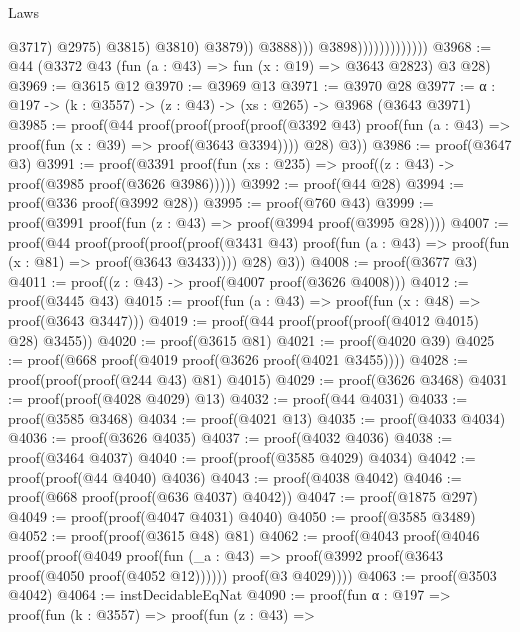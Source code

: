 \begin{lexlean}{Laws}
\begin{coremodule}
                                                                @3717)
                                                              @2975)
                                                            @3815)
                                                          @3810)
                                                        @3879))
                                                  @3888)))
                                        @3898)))))))))))))
@3968 := @44 (@3372 @43 (fun (a : @43) => fun (x : @19) => @3643 @2823) @3 @28)
@3969 := @3615 @12
@3970 := @3969 @13
@3971 := @3970 @28
@3977 := {α : @197} -> (k : @3557) -> (z : @43) -> (xs : @265) -> @3968 (@3643 @3971)
@3985 := proof(@44
      proof(proof(proof(proof(@3392 @43)
              proof(fun (a : @43) => proof(fun (x : @39) => proof(@3643 @3394))))
            @28)
          @3))
@3986 := proof(@3647 @3)
@3991 := proof(@3391 proof(fun (xs : @235) => proof((z : @43) -> proof(@3985 proof(@3626 @3986)))))
@3992 := proof(@44 @28)
@3994 := proof(@336 proof(@3992 @28))
@3995 := proof(@760 @43)
@3999 := proof(@3991 proof(fun (z : @43) => proof(@3994 proof(@3995 @28))))
@4007 := proof(@44
      proof(proof(proof(proof(@3431 @43)
              proof(fun (a : @43) => proof(fun (x : @81) => proof(@3643 @3433))))
            @28)
          @3))
@4008 := proof(@3677 @3)
@4011 := proof((z : @43) -> proof(@4007 proof(@3626 @4008)))
@4012 := proof(@3445 @43)
@4015 := proof(fun (a : @43) => proof(fun (x : @48) => proof(@3643 @3447)))
@4019 := proof(@44 proof(proof(proof(@4012 @4015) @28) @3455))
@4020 := proof(@3615 @81)
@4021 := proof(@4020 @39)
@4025 := proof(@668 proof(@4019 proof(@3626 proof(@4021 @3455))))
@4028 := proof(proof(proof(@244 @43) @81) @4015)
@4029 := proof(@3626 @3468)
@4031 := proof(proof(@4028 @4029) @13)
@4032 := proof(@44 @4031)
@4033 := proof(@3585 @3468)
@4034 := proof(@4021 @13)
@4035 := proof(@4033 @4034)
@4036 := proof(@3626 @4035)
@4037 := proof(@4032 @4036)
@4038 := proof(@3464 @4037)
@4040 := proof(proof(@3585 @4029) @4034)
@4042 := proof(proof(@44 @4040) @4036)
@4043 := proof(@4038 @4042)
@4046 := proof(@668 proof(proof(@636 @4037) @4042))
@4047 := proof(@1875 @297)
@4049 := proof(proof(@4047 @4031) @4040)
@4050 := proof(@3585 @3489)
@4052 := proof(proof(@3615 @48) @81)
@4062 := proof(@4043
      proof(@4046
          proof(proof(@4049
                proof(fun (_a : @43) => proof(@3992 proof(@3643 proof(@4050 proof(@4052 @12))))))
              proof(@3 @4029))))
@4063 := proof(@3503 @4042)
@4064 := instDecidableEqNat
@4090 := proof(fun {α : @197} =>
    proof(fun (k : @3557) =>
      proof(fun (z : @43) =>

\end{coremodule}
\end{lexlean}
